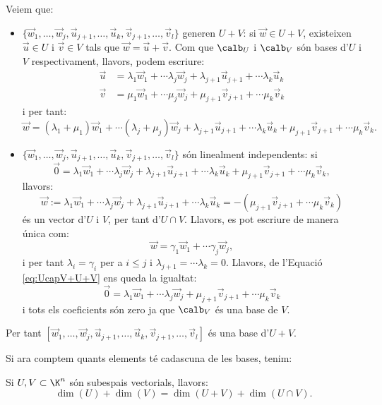 \begin{observacio}
    Veiem que:
    \begin{itemize}
        \item $\{\vec w_1, \dots , \vec w_j,\vec u_{j+1}, \dots, \vec u_k,\vec v_{j+1}, \dots, \vec v_l\}$ generen $U+V$: si $\vec w \in U+V$, existeixen $\vec u\in U$ i $\vec v\in V$ tals que $\vec w=\vec u +\vec v$. Com que $\calb_U$ i $\calb_V$ són bases d'$U$ i $V$ respectivament, llavors, podem escriure:
        \begin{align*}
            \vec u &=\lambda_1 \vec w_1 + \cdots \lambda _j \vec w_j + \lambda_{j+1} \vec u_{j+1} + \cdots \lambda_k \vec u_k \\
            \vec v &=\mu_1 \vec w_1 + \cdots \mu _j \vec w_j + \mu_{j+1} \vec v_{j+1} + \cdots \mu_k \vec v_k
        \end{align*}
        i per tant:
        $$
        \vec w=(\lambda_1+\mu_1) \vec w_1 + \cdots (\lambda _j+\mu_j) \vec w_j + \lambda_{j+1} \vec u_{j+1} + \cdots \lambda_k \vec u_k+\mu_{j+1}\vec v_{j+1} + \cdots \mu_k \vec v_k.
        $$
        \item $\{\vec w_1, \dots , \vec w_j,\vec u_{j+1}, \dots, \vec u_k,\vec v_{j+1}, \dots, \vec v_l\}$ són linealment independents: si
        \begin{equation}\label{eq:UcapV+U+V}
        \vec 0=\lambda_1 \vec w_1 + \cdots \lambda _j \vec w_j + \lambda_{j+1} \vec u_{j+1} + \cdots \lambda_k \vec u_k+\mu_{j+1}\vec v_{j+1} + \cdots \mu_k \vec v_k,
        \end{equation}
        llavors:
        $$
        \vec w := \lambda_1 \vec w_1 + \cdots \lambda _j \vec w_j + \lambda_{j+1} \vec u_{j+1} + \cdots \lambda_k \vec u_k=-(\mu_{j+1}\vec v_{j+1} + \cdots \mu_k \vec v_k)
        $$
        és un vector d'$U$ i $V$, per tant d'$U\cap V$. Llavors, es pot escriure de manera única com:
        $$
        \vec w= \gamma_1 \vec w_1 + \cdots \gamma _j \vec w_j,
        $$
        i per tant $\lambda_i=\gamma_i$ per a $i\leq j$ i $\lambda_{j+1}=\cdots \lambda_k=0$. Llavors, de l'Equació \eqref{eq:UcapV+U+V} ens queda la igualtat:
        $$
        \vec 0=\lambda_1 \vec w_1 + \cdots \lambda _j \vec w_j +\mu_{j+1}\vec v_{j+1} + \cdots \mu_k \vec v_k
        $$
        i tots els coeficients són zero ja que $\calb_V$ és una base de $V$.
    \end{itemize}
    Per tant $[\vec w_1, \dots , \vec w_j,\vec u_{j+1}, \dots, \vec u_k,\vec v_{j+1}, \dots, \vec v_l]$ és una base d'$U+V$.
\end{observacio}
Si ara comptem quants elements té cadascuna de les bases, tenim:
\begin{teorema}
    Si $U,V \subset \K^n$ són subespais vectorials, llavors:
    $$
    \dim(U)+\dim(V)=\dim(U+V)+\dim(U\cap V) .
    $$
\end{teorema}

